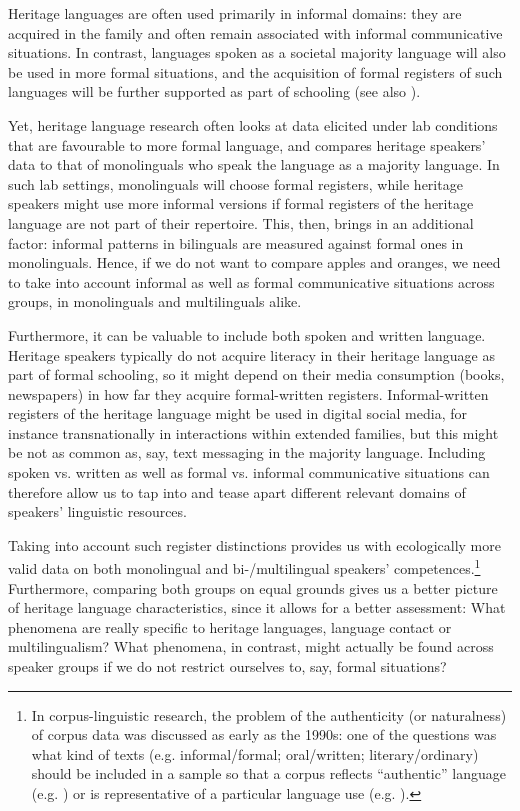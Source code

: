 \documentclass[output=paper,colorlinks,citecolor=brown]{langscibook}
\begin{document}
Heritage languages are often used primarily in informal domains: they are acquired in the family and often remain associated with informal communicative situations. In contrast, languages spoken as a societal majority language will also be used in more formal situations, and the acquisition of formal registers of such languages will be further supported as part of schooling (see also \cite{kupischrothman2018}).

Yet, heritage language research often looks at data elicited under lab conditions that are favourable to more formal language, and compares heritage speakers’ data to that of monolinguals who speak the language as a majority language. In such lab settings, monolinguals will choose formal registers, while heritage speakers might use more informal versions if formal registers of the heritage language are not part of their repertoire. This, then, brings in an additional factor: informal patterns in bilinguals are measured against formal ones in monolinguals. Hence, if we do not want to compare apples and oranges, we need to take into account informal as well as formal communicative situations across groups, in monolinguals and multilinguals alike.

Furthermore, it can be valuable to include both spoken and written language. Heritage speakers typically do not acquire literacy in their heritage language as part of formal schooling, so it might depend on their media consumption (books, newspapers) in how far they acquire formal-written registers. Informal-written registers of the heritage language might be used in digital social media, for instance transnationally in interactions within extended families, but this might be not as common as, say, text messaging in the majority language. Including spoken vs. written as well as formal vs. informal communicative situations can therefore allow us to tap into and tease apart different relevant domains of speakers’ linguistic resources.

\begin{sloppypar}
Taking into account such register distinctions provides us with ecologically more valid data on both monolingual and bi-/multilingual speakers’ competences.\footnote{In corpus-linguistic research, the problem of the authenticity (or naturalness) of corpus data was discussed as early as the 1990s: one of the questions was what kind of texts (e.g. informal/formal; oral/written; literary/ordinary) should be included in a sample so that a corpus reflects “authentic” language (e.g. \cite{sinclair1991}) or is representative of a particular language use (e.g. \cite{biber1993}).}  Furthermore, comparing both groups on equal grounds gives us a better picture of heritage language characteristics, since it allows for a better assessment: What phenomena are really specific to heritage languages, language contact or multilingualism? What phenomena, in contrast, might actually be found across speaker groups if we do not restrict ourselves to, say, formal situations?
\end{sloppypar}
\end{document}
